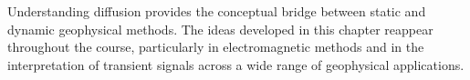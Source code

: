 Understanding diffusion provides the conceptual bridge between static and dynamic geophysical methods. The ideas developed in this chapter reappear throughout the course, particularly in electromagnetic methods and in the interpretation of transient signals across a wide range of geophysical applications.